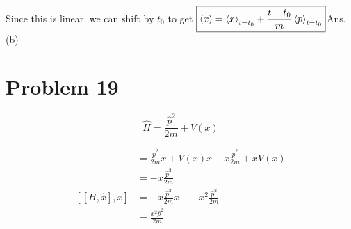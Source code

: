 \documentclass[12pt]{article}
\begin{document}
Since this is linear, we can shift by $t_0$ to get $\boxed{\Braket{x}=\Braket{x}_{t=t_0} + \frac{t-t_0}{m}\Braket{p}_{t=t_0}}$\hfill Ans. (b)
\section{Problem 19}
$$\hat H = \frac{\hat p^2}{2m}+V(x)$$

\begin{align*}
[H,\hat x]&=\frac{\hat p^2}{2m}x+V(x)x-x\frac{\hat p^2}{2m}+xV(x)\\
&=-x\frac{\hat p^2}{2m}\\
[[H,\hat x],x]&=-x\frac{\hat p^2}{2m}x - -x^2\frac{\hat p^2}{2m}\\
&=\frac{x^2\hat p^2}{2m}
\end{align*}
\end{document}
